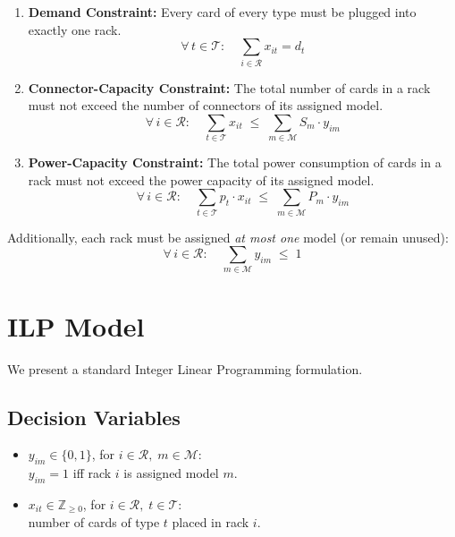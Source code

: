 \documentclass[11pt,a4paper]{article}
\newcommand{\setR}{\mathcal{R}}
\newcommand{\setM}{\mathcal{M}}
\newcommand{\setT}{\mathcal{T}}
\begin{document}
\begin{tcolorbox}[colback=blue!5!white, colframe=blue!50!black,
  title={\textbf{Constraint Summary}}]
\begin{enumerate}
  \item \textbf{Demand Constraint:}
        Every card of every type must be plugged into exactly one rack.
        \[
          \forall\, t \in \setT:\quad
          \sum_{i \in \setR} x_{it} = d_t
        \]

  \item \textbf{Connector-Capacity Constraint:}
        The total number of cards in a rack must not exceed the number
        of connectors of its assigned model.
        \[
          \forall\, i \in \setR:\quad
          \sum_{t \in \setT} x_{it}
          \;\le\;
          \sum_{m \in \setM} S_m \cdot y_{im}
        \]

  \item \textbf{Power-Capacity Constraint:}
        The total power consumption of cards in a rack must not exceed
        the power capacity of its assigned model.
        \[
          \forall\, i \in \setR:\quad
          \sum_{t \in \setT} p_t \cdot x_{it}
          \;\le\;
          \sum_{m \in \setM} P_m \cdot y_{im}
        \]
\end{enumerate}
\end{tcolorbox}

\noindent
Additionally, each rack must be assigned \emph{at most one} model
(or remain unused):
\[
  \forall\, i \in \setR:\quad
  \sum_{m \in \setM} y_{im} \;\le\; 1
\]

\section{ILP Model}
\label{sec:ilp}

We present a standard Integer Linear Programming formulation.

\subsection{Decision Variables}

\begin{itemize}
  \item $y_{im} \in \{0,1\}$, for $i \in \setR,\; m \in \setM$:\\
        $y_{im} = 1$ iff rack $i$ is assigned model $m$.
  \item $x_{it} \in \mathbb{Z}_{\ge 0}$, for $i \in \setR,\; t \in \setT$:\\
        number of cards of type $t$ placed in rack $i$.
\end{itemize}
\end{document}
